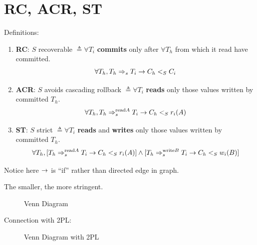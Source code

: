 \documentclass[a4paper]{report}
\begin{document}
\section{RC, ACR, ST}
Definitions:
\begin{enumerate}
\item \textbf{RC}: $S$ recoverable $\triangleq \forall T_i$ \textbf{commits} only after $\forall T_h$ from which it read have committed. 
$$
\forall T_h, T_h \Rightarrow_s T_i \rightarrow C_h <_S C_i
$$
\item \textbf{ACR}: $S$ avoids cascading rollback $\triangleq \forall T_i$ \textbf{reads} only those values written by committed $T_h$. 
$$
\forall T_h, T_h \Rightarrow_s^{\text{read} A} T_i \rightarrow C_h <_S r_i (A)
$$
\item \textbf{ST}: $S$ strict $\triangleq \forall T_i$ \textbf{reads} and \textbf{writes} only those values written by committed $T_h$.
$$
\forall T_h, [T_h \Rightarrow_s^{\text{read} A} T_i \rightarrow C_h <_S r_i(A)] \wedge[T_h \Rightarrow_s^{\text{write} B} T_i \rightarrow C_h <_S w_i(B)]
$$
\end{enumerate}

Notice here $\rightarrow$ is ``if'' rather than directed edge in graph. 

The smaller, the more stringent. 
\begin{figure}[H]
\centering
{}
\caption{Venn Diagram}
\label{fig:FRCCDiagram}
\end{figure}
Connection with 2PL:
\begin{figure}[H]
\centering
{}
\caption{Venn Diagram with 2PL}
\label{fig:FRCCDiagram}
\end{figure}
\end{document}
